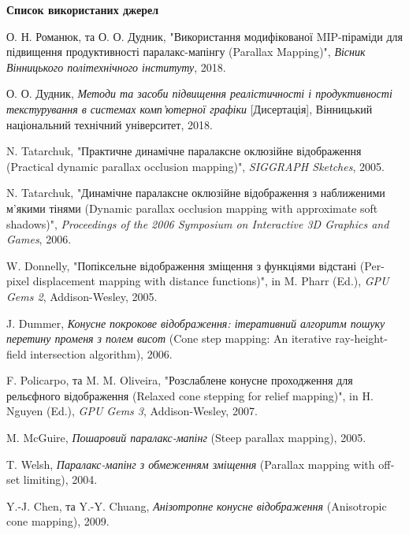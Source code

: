 \documentclass[14pt,a4paper]{extarticle}
\newcommand{\eng}[1]{\foreignlanguage{english}{#1}}
\begin{document}
\par\vspace{\baselineskip}
\begin{center}
\textbf{Список використаних джерел}
\end{center}

\begingroup
\setlength{\parindent}{0pt}
\setlength{\leftskip}{0pt}
\setlength{\rightskip}{0pt}
\setlength{\parskip}{0pt}
\justifying

\begin{enumerate}[leftmargin=0.75cm,labelwidth=1cm,labelsep=0cm,align=left,label={[\arabic*]},itemsep=0pt,topsep=0pt,parsep=0pt]
  \item О. Н. Романюк, та О. О. Дудник, "Використання модифікованої MIP-піраміди для підвищення продуктивності паралакс-мапінгу (\eng{Parallax Mapping})", \textit{Вісник Вінницького політехнічного інституту}, 2018.
  \item О. О. Дудник, \textit{Методи та засоби підвищення реалістичності і продуктивності текстурування в системах комп'ютерної графіки} [Дисертація], Вінницький національний технічний університет, 2018.
  \item N. Tatarchuk, "Практичне динамічне паралаксне оклюзійне відображення (\eng{Practical dynamic parallax occlusion mapping})", \textit{SIGGRAPH Sketches}, 2005.
  \item N. Tatarchuk, "Динамічне паралаксне оклюзійне відображення з наближеними м'якими тінями (\eng{Dynamic parallax occlusion mapping with approximate soft shadows})", \textit{Proceedings of the 2006 Symposium on Interactive 3D Graphics and Games}, 2006.
  \item W. Donnelly, "Попіксельне відображення зміщення з функціями відстані (\eng{Per-pixel displacement mapping with distance functions})", in M. Pharr (Ed.), \textit{GPU Gems 2}, Addison-Wesley, 2005.
  \item J. Dummer, \textit{Конусне покрокове відображення: ітеративний алгоритм пошуку перетину променя з полем висот} (\eng{Cone step mapping: An iterative ray-heightfield intersection algorithm}), 2006.
  \item F. Policarpo, та M. M. Oliveira, "Розслаблене конусне проходження для рельєфного відображення (\eng{Relaxed cone stepping for relief mapping})", in H. Nguyen (Ed.), \textit{GPU Gems 3}, Addison-Wesley, 2007.
  \item M. McGuire, \textit{Пошаровий паралакс-мапінг} (\eng{Steep parallax mapping}), 2005.
  \item T. Welsh, \textit{Паралакс-мапінг з обмеженням зміщення} (\eng{Parallax mapping with offset limiting}), 2004.
  \item Y.-J. Chen, та Y.-Y. Chuang, \textit{Анізотропне конусне відображення} (\eng{Anisotropic cone mapping}), 2009.
\end{enumerate}

\endgroup
\end{document}
